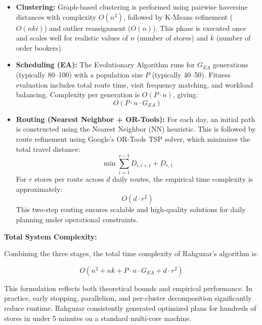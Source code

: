 \begin{itemize}
  \item \textbf{Clustering:} Graph-based clustering is performed using pairwise haversine distances with complexity $O(n^2)$, followed by K-Means refinement ($O(nki)$) and outlier reassignment ($O(n)$). This phase is executed once and scales well for realistic values of $n$ (number of stores) and $k$ (number of order bookers).

  \item \textbf{Scheduling (EA):} The Evolutionary Algorithm runs for $G_{EA}$ generations (typically 80–100) with a population size $P$ (typically 40–50). Fitness evaluation includes total route time, visit frequency matching, and workload balancing. Complexity per generation is $O(P \cdot n)$, giving:
  \[
  O(P \cdot n \cdot G_{EA})
  \]

  \item \textbf{Routing (Nearest Neighbor + OR-Tools):} For each day, an initial path is constructed using the Nearest Neighbor (NN) heuristic. This is followed by route refinement using Google's OR-Tools TSP solver, which minimizes the total travel distance:
\[
\min \sum_{i=1}^{r-1} D_{i,i+1} + D_{r,1}
\]
For $r$ stores per route across $d$ daily routes, the empirical time complexity is approximately:
\[
O(d \cdot r^2)
\]
This two-step routing ensures scalable and high-quality solutions for daily planning under operational constraints.
\end{itemize}

\textbf{Total System Complexity:}

Combining the three stages, the total time complexity of Rahguzar’s algorithm is:

\[
O(n^2 + nk + P \cdot n \cdot G_{EA} + d \cdot r^2)
\]


This formulation reflects both theoretical bounds and empirical performance. In practice, early stopping, parallelism, and per-cluster decomposition significantly reduce runtime. Rahguzar consistently generated optimized plans for hundreds of stores in under 5 minutes on a standard multi-core machine.
